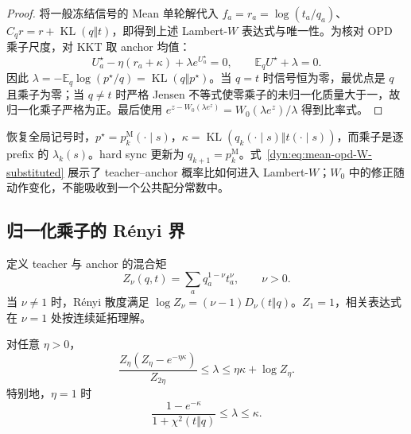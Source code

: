 \documentclass[lang=cn,scheme=chinese,openany]{../book/elegantbook}
\newcommand{\E}{\mathbb E}
\newcommand{\KL}{\operatorname{KL}}
\begin{document}
\begin{proof}
将一般冻结信号的 Mean 单轮解代入 $f_a=r_a=\log(t_a/q_a)$、$C_qr=r+\KL(q\Vert t)$，即得到上述 Lambert-$W$ 表达式与唯一性。为核对 OPD 乘子尺度，对 KKT 取 anchor 均值：
\begin{equation*}
U_a^\star-\eta(r_a+\kappa)+\lambda e^{U_a^\star}=0,
\qquad \E_qU^\star+\lambda=0.
\end{equation*}
因此 $\lambda=-\E_q\log(p^\star/q)=\KL(q\Vert p^\star)$。当 $q=t$ 时信号恒为零，最优点是 $q$ 且乘子为零；当 $q\ne t$ 时严格 Jensen 不等式使零乘子的未归一化质量大于一，故归一化乘子严格为正。最后使用 $e^{z-W_0(\lambda e^z)}=W_0(\lambda e^z)/\lambda$ 得到比率式。
\end{proof}

恢复全局记号时，$p^\star=p_k^{\mathrm M}(\cdot\mid s)$，$\kappa=\KL(q_k(\cdot\mid s)\Vert t(\cdot\mid s))$，而乘子是逐 prefix 的 $\lambda_k(s)$。hard sync 更新为 $q_{k+1}=p_k^{\mathrm M}$。式~\eqref{dyn:eq:mean-opd-W-substituted} 展示了 teacher--anchor 概率比如何进入 Lambert-$W$；$W_0$ 中的修正随动作变化，不能吸收到一个公共配分常数中。

\subsection{归一化乘子的 R\'enyi 界}

定义 teacher 与 anchor 的混合矩
\begin{equation}
 Z_\nu(q,t)=\sum_a q_a^{1-\nu}t_a^\nu,
 \qquad \nu>0.
 \label{dyn:eq:mean-opd-renyi-Z}
\end{equation}
当 $\nu\ne1$ 时，R\'enyi 散度满足 $\log Z_\nu=(\nu-1)D_\nu(t\Vert q)$。$Z_1=1$，相关表达式在 $\nu=1$ 处按连续延拓理解。

\begin{proposition}
\label{dyn:prop:mean-opd-renyi-bounds}
对任意 $\eta>0$，
\begin{equation}
 \frac{Z_\eta(Z_\eta-e^{-\eta\kappa})}{Z_{2\eta}}
 \le\lambda\le\eta\kappa+\log Z_\eta.
 \label{dyn:eq:mean-opd-renyi-bounds}
\end{equation}
特别地，$\eta=1$ 时
\begin{equation}
 \frac{1-e^{-\kappa}}{1+\chi^2(t\Vert q)}
 \le\lambda\le\kappa.
 \label{dyn:eq:mean-opd-eta-one-bounds}
\end{equation}
\end{proposition}
\end{document}
